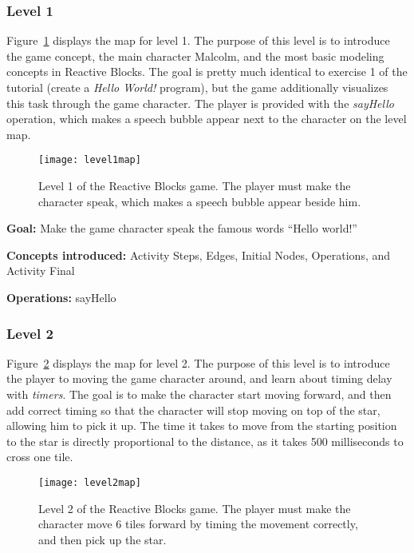 \subsubsection{Level 1}
Figure~\ref{fig:level1map} displays the map for level 1. The purpose of this level is to introduce the game concept, the main character Malcolm, and the most basic modeling concepts in Reactive Blocks. The goal is pretty much identical to exercise 1 of the tutorial (create a \emph{Hello World!} program), but the game additionally visualizes this task through the game character. The player is provided with the \emph{sayHello} operation, which makes a speech bubble appear next to the character on the level map.

\begin{figure}[htp]
	\centering
	\texttt{[image: level1map]}
	\caption[Level 1 of the Reactive Blocks game]{Level 1 of the Reactive Blocks game. The player must make the character speak, which makes a speech bubble appear beside him.}
	\label{fig:level1map}
\end{figure}

\noindent
\textbf{Goal:} Make the game character speak the famous words ``Hello world!''

\noindent
\textbf{Concepts introduced:} Activity Steps, Edges, Initial Nodes, Operations, and Activity Final

\noindent
\textbf{Operations:} sayHello

\subsubsection{Level 2}
Figure~\ref{fig:level2map} displays the map for level 2. The purpose of this level is to introduce the player to moving the game character around, and learn about timing delay with \emph{timers}. The goal is to make the character start moving forward, and then add correct timing so that the character will stop moving on top of the star, allowing him to pick it up. The time it takes to move from the starting position to the star is directly proportional to the distance, as it takes 500 milliseconds to cross one tile.

\begin{figure}[htp]
	\centering
	\texttt{[image: level2map]}
	\caption[Level 2 of the Reactive Blocks game]{Level 2 of the Reactive Blocks game. The player must make the character move 6 tiles forward by timing the movement correctly, and then pick up the star.}
	\label{fig:level2map}
\end{figure}

